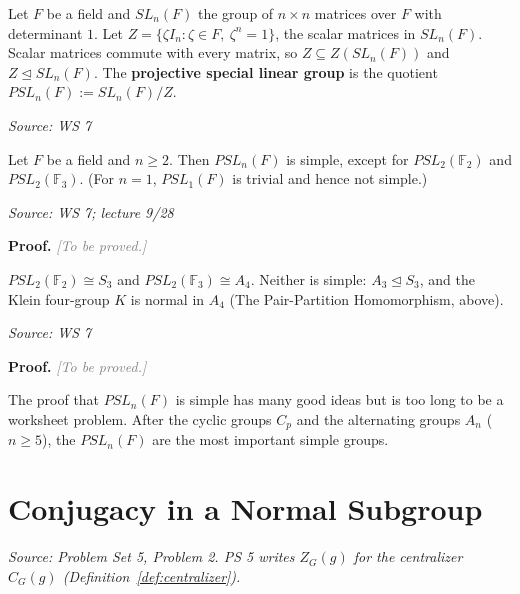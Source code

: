 \documentclass[11pt]{report}
\newcommand{\proofpending}{\noindent\textbf{Proof.} \textcolor{gray}{\textit{[To be proved.]}}\par\vspace{5pt}}
\newcommand{\srcline}[1]{\par\hfill{\footnotesize\textit{Source: #1}}}
\begin{document}
\begin{defbox}\label{def:projective-special-linear-group}
Let $F$ be a field and $SL_n(F)$ the group of $n \times n$ matrices over $F$ with determinant $1$. Let $Z = \{\zeta I_n : \zeta \in F,\ \zeta^n = 1\}$, the scalar matrices in $SL_n(F)$. Scalar matrices commute with every matrix, so $Z \subseteq Z(SL_n(F))$ and $Z \trianglelefteq SL_n(F)$. The \textbf{projective special linear group} is the quotient $PSL_n(F) := SL_n(F)/Z$.
\srcline{WS 7}
\end{defbox}

\begin{thmbox}\label{thm:psln-f-simple}
Let $F$ be a field and $n \geq 2$. Then $PSL_n(F)$ is simple, except for $PSL_2(\mathbb{F}_2)$ and $PSL_2(\mathbb{F}_3)$. (For $n = 1$, $PSL_1(F)$ is trivial and hence not simple.)
\srcline{WS 7; lecture 9/28}
\end{thmbox}

\proofpending

\begin{exbox}\label{ex:two-exceptions}
$PSL_2(\mathbb{F}_2) \cong S_3$ and $PSL_2(\mathbb{F}_3) \cong A_4$. Neither is simple: $A_3 \trianglelefteq S_3$, and the Klein four-group $K$ is normal in $A_4$ (The Pair-Partition Homomorphism, above).
\srcline{WS 7}
\end{exbox}

\proofpending

\begin{rembox}\label{rem:about-proof}
The proof that $PSL_n(F)$ is simple has many good ideas but is too long to be a worksheet problem. After the cyclic groups $C_p$ and the alternating groups $A_n$ ($n \geq 5$), the $PSL_n(F)$ are the most important simple groups.
\end{rembox}

\section{Conjugacy in a Normal Subgroup}\label{sec:normal-conjugacy}

\textit{Source: Problem Set 5, Problem 2. PS 5 writes $Z_G(g)$ for the centralizer $C_G(g)$ (Definition~\ref{def:centralizer}).}
\end{document}
